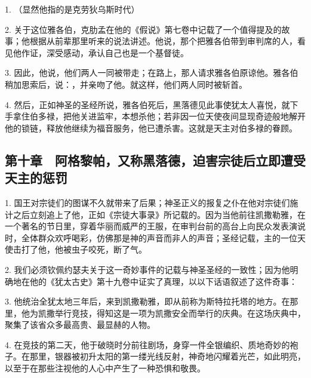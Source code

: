 1. （显然他指的是克劳狄乌斯时代）\par

2. 关于这位雅各伯，克肋孟在他的《假说》第七卷中记载了一个值得提及的故事；他根据从前辈那里听来的说法讲述。他说，那个把雅各伯带到审判席的人，看见他作证，深受感动，承认自己也是一个基督徒。\par

3. 因此，他说，他们两人一同被带走；在路上，那人请求雅各伯原谅他。雅各伯稍加思索后，说：，并亲吻了他。就这样，他们两人同时被斩首。\par

4. 然后，正如神圣的圣经所说，雅各伯死后，黑落德见此事使犹太人喜悦，就下手拿住伯多禄，把他关进监牢，本想杀他；若非因一位天使夜间显现奇迹般地解开他的锁链，释放他继续为福音服务，他已遭杀害。这就是天主对伯多禄的眷顾。\par


\subsection{第十章　阿格黎帕，又称黑落德，迫害宗徒后立即遭受天主的惩罚}

1. 国王对宗徒们的图谋不久就带来了后果；神圣正义的报复之仆在他对宗徒们施计之后立刻追上了他，正如《宗徒大事录》所记载的。因为当他前往凯撒勒雅，在一个著名的节日里，穿着华丽而威严的王服，在审判台前的高台上向民众发表演说时，全体群众欢呼喝彩，仿佛那是神的声音而非人的声音；圣经记载，主的一位天使击打了他，他被虫子咬死，断了气。\par

2. 我们必须钦佩约瑟夫关于这一奇妙事件的记载与神圣圣经的一致性；因为他明确地在他的《犹太古史》第十九卷中证实了真理，以以下话语叙述了这件奇事：\par

3. 他统治全犹太地三年后，来到凯撒勒雅，即从前称为斯特拉托塔的地方。在那里，他为凯撒举行竞技，得知这是一项为凯撒安全而举行的庆典。在这场庆典中，聚集了该省众多最高贵、最显赫的人物。\par

4. 在竞技的第二天，他于破晓时分前往剧场，身穿一件全银编织、质地奇妙的袍子。在那里，银器被初升太阳的第一缕光线反射，神奇地闪耀着光芒，如此明亮，以至于在那些注视他的人心中产生了一种恐惧和敬畏。\par

